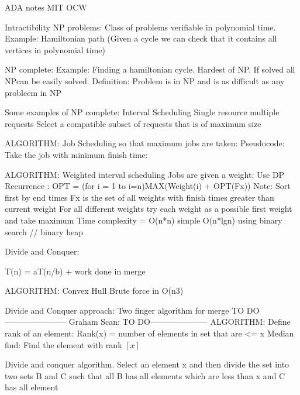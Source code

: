 \documentclass[20pt]{article}
\begin{document}
ADA notes MIT OCW

Intractibility
NP problems: Class of problems verifiable in polynomial time. Example: Hamiltonian path (Given a cycle we can check that it contains all vertices in polynomial time)

NP complete: 
Example: Finding a hamiltonian cycle. Hardest of NP. If solved all NPcan be easily solved.
Definition: Problem is in NP and is as difficult as any probleem in NP 

Some examples of NP complete:
Interval Scheduling
Single resource multiple requests
Select a compatible subset of requests that is of maximum size

ALGORITHM: Job Scheduling so that maximum jobs are taken: 
Pseudocode:
Take the job with minimum finish time:

ALGORITHM: 
Weighted interval scheduling
Jobs are given a weight;
Use DP
Recurrence :  OPT = (for i = 1 to i=n)MAX(Weight(i) + OPT(Fx))
Note: Sort first by end times
Fx is the set of all weights with finish times greater than current weight
For all different weights try each weight as a possible first weight and take maximum
Time complexity = O(n*n) {simple} O(n*lgn) {using binary search // binary heap}

Divide and Conquer:

T(n) = aT(n/b) + {work done in merge}


ALGORITHM: Convex Hull
Brute force in O(n3)

Divide and Conquer approach:
Two finger algorithm for merge
TO DO -----------------------
Graham Scan:
TO DO---------------------
ALGORITHM:
Define rank of an element: Rank(x) = number of elements in set that are <= x
Median find: Find the element with rank $ \left \lceil{x}\right \rceil $

Divide and conquer algorithm.
Select an element x and then divide the set into two sets B and C such that all B has all elements which are less than x and C has all element









	
\end{document}
